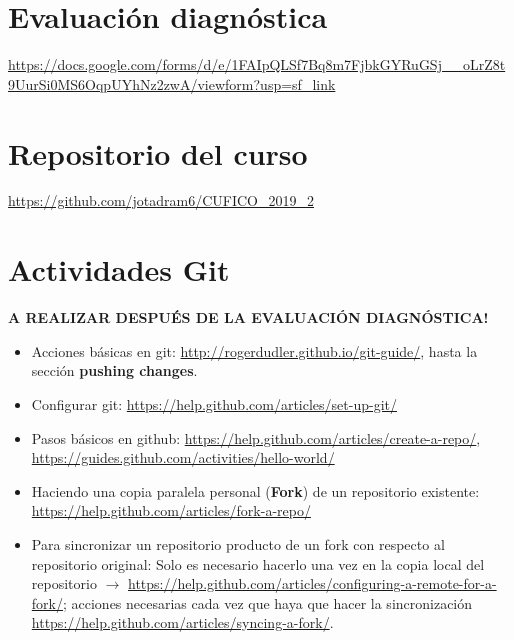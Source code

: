 \documentclass[10.5pt]{article}
\begin{document}
\section{Evaluación diagnóstica}

\url{https://docs.google.com/forms/d/e/1FAIpQLSf7Bq8m7FjbkGYRuGSj__oLrZ8t9UurSi0MS6OqpUYhNz2zwA/viewform?usp=sf_link}

\section{Repositorio del curso}

\url{https://github.com/jotadram6/CUFICO_2019_2}

\section{Actividades Git}

{\textbf{A REALIZAR DESPUÉS DE LA EVALUACIÓN DIAGNÓSTICA!}}

\begin{itemize}
\item Acciones básicas en git: \url{http://rogerdudler.github.io/git-guide/}, hasta la sección {\textbf{pushing changes}}.
\item Configurar git: \url{https://help.github.com/articles/set-up-git/}
\item Pasos básicos en github: \url{https://help.github.com/articles/create-a-repo/}, \url{https://guides.github.com/activities/hello-world/}
\item Haciendo una copia paralela personal ({\textbf{Fork}}) de un repositorio existente: \url{https://help.github.com/articles/fork-a-repo/}
\item Para sincronizar un repositorio producto de un fork con respecto al repositorio original: Solo es necesario hacerlo una vez en la copia local del repositorio $\rightarrow$ \url{https://help.github.com/articles/configuring-a-remote-for-a-fork/}; acciones necesarias cada vez que haya que hacer la sincronización \url{https://help.github.com/articles/syncing-a-fork/}.
\end{itemize}
\end{document}
